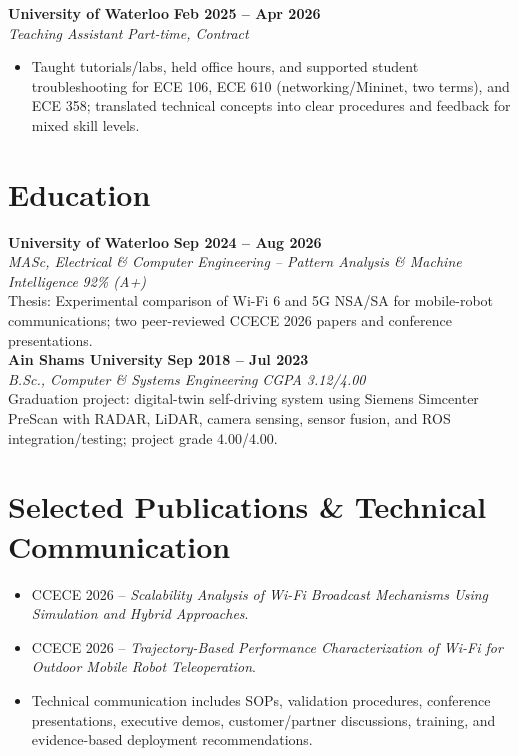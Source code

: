 \documentclass[letterpaper,10pt]{article}
\newcommand{\role}[4]{\textbf{#1} \hfill \textbf{#2} \\
\textit{#3} \hfill \textit{#4} \\
}
\begin{document}
\role{University of Waterloo}{Feb 2025 -- Apr 2026}{Teaching Assistant}{Part-time, Contract}
\begin{itemize}
  \item Taught tutorials/labs, held office hours, and supported student troubleshooting for ECE 106, ECE 610 (networking/Mininet, two terms), and ECE 358; translated technical concepts into clear procedures and feedback for mixed skill levels.
\end{itemize}

\section{Education}
\textbf{University of Waterloo} \hfill \textbf{Sep 2024 -- Aug 2026} \\
\textit{MASc, Electrical \& Computer Engineering -- Pattern Analysis \& Machine Intelligence} \hfill \textit{92\% (A+)} \\
Thesis: Experimental comparison of Wi-Fi 6 and 5G NSA/SA for mobile-robot communications; two peer-reviewed CCECE 2026 papers and conference presentations. \\
\vspace{3pt}
\textbf{Ain Shams University} \hfill \textbf{Sep 2018 -- Jul 2023} \\
\textit{B.Sc., Computer \& Systems Engineering} \hfill \textit{CGPA 3.12/4.00} \\
Graduation project: digital-twin self-driving system using Siemens Simcenter PreScan with RADAR, LiDAR, camera sensing, sensor fusion, and ROS integration/testing; project grade 4.00/4.00.

\section{Selected Publications \& Technical Communication}
\begin{itemize}
  \item CCECE 2026 -- \textit{Scalability Analysis of Wi-Fi Broadcast Mechanisms Using Simulation and Hybrid Approaches}.
  \item CCECE 2026 -- \textit{Trajectory-Based Performance Characterization of Wi-Fi for Outdoor Mobile Robot Teleoperation}.
  \item Technical communication includes SOPs, validation procedures, conference presentations, executive demos, customer/partner discussions, training, and evidence-based deployment recommendations.
\end{itemize}
\end{document}
